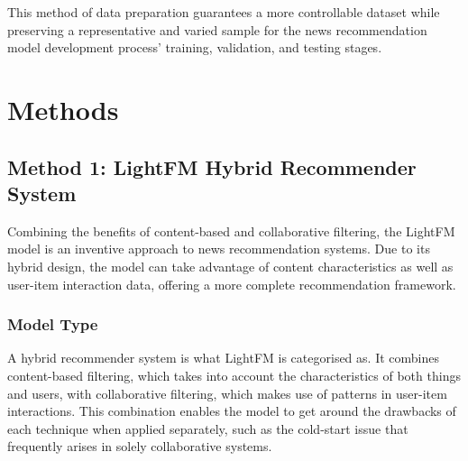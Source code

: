 \documentclass[9pt,twocolumn,twoside,lineno]{gsajnl}
\begin{document}
This method of data preparation guarantees a more controllable dataset while preserving a representative and varied sample for the news recommendation model development process' training, validation, and testing stages.

\section{Methods}
\subsection{Method 1: LightFM Hybrid Recommender System}
Combining the benefits of content-based and collaborative filtering, the LightFM model is an inventive approach to news recommendation systems.  Due to its hybrid design, the model can take advantage of content characteristics as well as user-item interaction data, offering a more complete recommendation framework.

\subsubsection{Model Type\newline}
A hybrid recommender system is what LightFM is categorised as.  It combines content-based filtering, which takes into account the characteristics of both things and users, with collaborative filtering, which makes use of patterns in user-item interactions.  This combination enables the model to get around the drawbacks of each technique when applied separately, such as the cold-start issue that frequently arises in solely collaborative systems.
\end{document}
